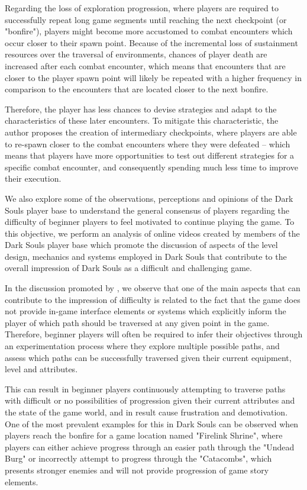 Regarding the loss of exploration progression, where players are required to successfully repeat long game segments until reaching the next checkpoint (or "bonfire"), players might become more accustomed to combat encounters which occur closer to their spawn point. Because of the incremental loss of sustainment resources over the traversal of environments, chances of player death are increased after each combat encounter, which means that encounters that are closer to the player spawn point will likely be repeated with a higher frequency in comparison to the encounters that are located closer to the next bonfire.

Therefore, the player has less chances to devise strategies and adapt to the characteristics of these later encounters. To mitigate this characteristic, the author proposes the creation of intermediary checkpoints, where players are able to re-spawn closer to the combat encounters where they were defeated -- which means that players have more opportunities to test out different strategies for a specific combat encounter, and consequently spending much less time to improve their execution.

We also explore some of the observations, perceptions and opinions of the Dark Souls player base to understand the general consensus of players regarding the difficulty of beginner players to feel motivated to continue playing the game. To this objective, we perform an analysis of online videos created by members of the Dark Souls player base which promote the discussion of aspects of the level design, mechanics and systems employed in Dark Souls that contribute to the overall impression of Dark Souls as a difficult and challenging game.

In the discussion promoted by \cite{YT_HowChallengingIsDarkSouls}, we observe that one of the main aspects that can contribute to the impression of difficulty is related to the fact that the game does not provide in-game interface elements or systems which explicitly inform the player of which path should be traversed at any given point in the game. Therefore, beginner players will often be required to infer their objectives through an experimentation process where they explore multiple possible paths, and assess which paths can be successfully traversed given their current equipment, level and attributes.

This can result in beginner players continuously attempting to traverse paths with difficult or no possibilities of progression given their current attributes and the state of the game world, and in result cause frustration and demotivation. One of the most prevalent examples for this in Dark Souls can be observed when players reach the bonfire for a game location named "Firelink Shrine", where players can either achieve progress through an easier path through the "Undead Burg" or incorrectly attempt to progress through the "Catacombs", which presents stronger enemies and will not provide progression of game story elements.

